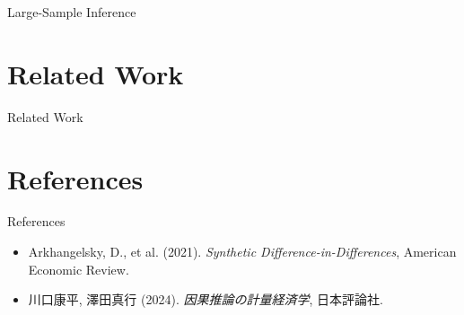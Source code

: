 \documentclass[xcolor=svgnames,aspectratio=169]{beamer}
\begin{document}
\begin{frame}{Large-Sample Inference}
\end{frame}

\section{Related Work}

\begin{frame}{Related Work}
\end{frame}

\section{References}
\begin{frame}{References}
    \begin{itemize}
        \item Arkhangelsky, D., et al. (2021). 
        \textit{Synthetic Difference-in-Differences}, American Economic Review.
        \item 川口康平, 澤田真行 (2024). 
        \textit{因果推論の計量経済学}, 日本評論社.
\end{itemize}
\end{frame}
\end{document}
